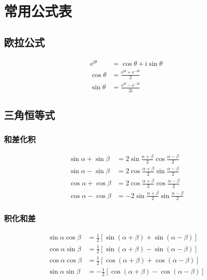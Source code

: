 
\chapter{常用公式表}

\section{欧拉公式}
\begin{zhongyao}[欧拉公式]
\begin{align}
    \mathrm{e}^{\mathrm{i}\theta} &= \cos\theta + \mathrm{i}\sin\theta \\
    \cos\theta &= \frac{\mathrm{e}^{\mathrm{i}\theta} + \mathrm{e}^{-\mathrm{i}\theta}}{2} \\
    \sin\theta &= \frac{\mathrm{e}^{\mathrm{i}\theta} - \mathrm{e}^{-\mathrm{i}\theta}}{2\mathrm{i}}
\end{align}
\end{zhongyao}

\section{三角恒等式}

\subsection{和差化积}
\begin{align}
    \sin\alpha + \sin\beta &= 2\sin\frac{\alpha+\beta}{2}\cos\frac{\alpha-\beta}{2} \\
    \sin\alpha - \sin\beta &= 2\cos\frac{\alpha+\beta}{2}\sin\frac{\alpha-\beta}{2} \\
    \cos\alpha + \cos\beta &= 2\cos\frac{\alpha+\beta}{2}\cos\frac{\alpha-\beta}{2} \\
    \cos\alpha - \cos\beta &= -2\sin\frac{\alpha+\beta}{2}\sin\frac{\alpha-\beta}{2}
\end{align}

\subsection{积化和差}
\begin{align}
    \sin\alpha\cos\beta &= \frac{1}{2}[\sin(\alpha+\beta) + \sin(\alpha-\beta)] \\
    \cos\alpha\sin\beta &= \frac{1}{2}[\sin(\alpha+\beta) - \sin(\alpha-\beta)] \\
    \cos\alpha\cos\beta &= \frac{1}{2}[\cos(\alpha+\beta) + \cos(\alpha-\beta)] \\
    \sin\alpha\sin\beta &= -\frac{1}{2}[\cos(\alpha+\beta) - \cos(\alpha-\beta)]
\end{align}

